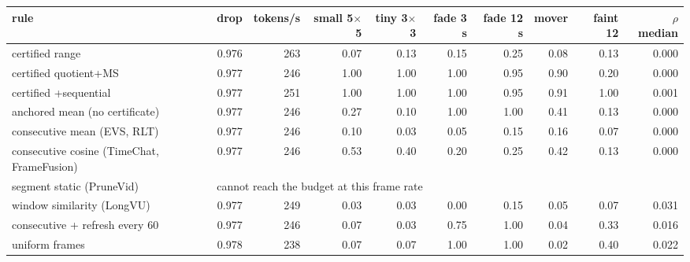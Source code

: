 \begin{tabular}{lrrrrrrrrr}
\toprule
rule & drop & tokens/s & small 5$\times$5 & tiny 3$\times$3 & fade 3 s & fade 12 s & mover & faint 12 & $\rho$ median \\
\midrule
certified range & 0.976 & 263 & 0.07 & 0.13 & 0.15 & 0.25 & 0.08 & 0.13 & 0.000 \\
certified quotient+MS & 0.977 & 246 & 1.00 & 1.00 & 1.00 & 0.95 & 0.90 & 0.20 & 0.000 \\
certified +sequential & 0.977 & 251 & 1.00 & 1.00 & 1.00 & 0.95 & 0.91 & 1.00 & 0.001 \\
anchored mean (no certificate) & 0.977 & 246 & 0.27 & 0.10 & 1.00 & 1.00 & 0.41 & 0.13 & 0.000 \\
consecutive mean (EVS, RLT) & 0.977 & 246 & 0.10 & 0.03 & 0.05 & 0.15 & 0.16 & 0.07 & 0.000 \\
consecutive cosine (TimeChat, FrameFusion) & 0.977 & 246 & 0.53 & 0.40 & 0.20 & 0.25 & 0.42 & 0.13 & 0.000 \\
segment static (PruneVid) & \multicolumn{9}{l}{cannot reach the budget at this frame rate} \\
window similarity (LongVU) & 0.977 & 249 & 0.03 & 0.03 & 0.00 & 0.15 & 0.05 & 0.07 & 0.031 \\
consecutive + refresh every 60 & 0.977 & 246 & 0.07 & 0.03 & 0.75 & 1.00 & 0.04 & 0.33 & 0.016 \\
uniform frames & 0.978 & 238 & 0.07 & 0.07 & 1.00 & 1.00 & 0.02 & 0.40 & 0.022 \\
\bottomrule
\end{tabular}

